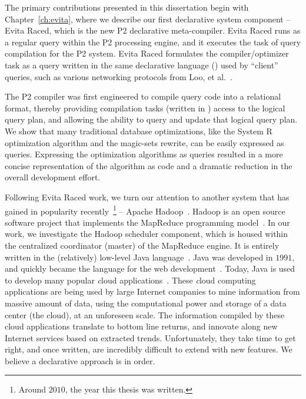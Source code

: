 The primary contributions presented in this dissertation begin with
Chapter~\ref{ch:evita}, where we describe our first declarative system
component -- Evita Raced, which is the new P2 declarative meta-compiler.  Evita
Raced runs as a regular query within the P2 processing engine, and it executes
the task of query compilation for the P2 system.  Evita Raced formulates the
compiler/optimizer task as a query written in the same declarative language
(\OVERLOG) used by ``client'' queries, such as various networking protocols
from Loo, et al.~\cite{loo-sigmod06, p2:sosp}.

The P2 compiler was first engineered to compile query code into a relational
format, thereby providing compilation tasks (written in \OVERLOG) access to the
logical query plan, and allowing the ability to query and update that logical
query plan.  We show that many traditional database optimizations, like the
System R optimization algorithm and the magic-sets rewrite, can be easily
expressed as \OVERLOG queries.  Expressing the optimization algorithms as
\OVERLOG queries resulted in a more concise representation of the algorithm as
code and a dramatic reduction in the overall development effort.
 
Following Evita Raced work, we turn our attention to another system that has
gained in popularity recently~\footnote{Around $2010$, the year this thesis was
written.} -- Apache Hadoop~\cite{hadoop}.  Hadoop is an open source software
project that implements the MapReduce programming model~\cite{mapreduce-osdi}.
In our work, we investigate the Hadoop scheduler component, which is housed
within the centralized coordinator (master) of the MapReduce engine.  It is
entirely written in the (relatively) low-level Java language~\cite{java}.  Java
was developed in $1991$, and quickly became the language for the web
development~\cite{java-history}.  Today, Java is used to develop many popular
{\emph cloud} applications~\cite{pig-sigmod, hive-vldb, zookeeper, hbase,
cassandra}.  These {\emph cloud computing} applications are being used by large
Internet companies to mine information from massive amount of data, using the
computational power and storage of a data center (the cloud), at an unforeseen
scale.  The information compiled by these cloud applications translate to
bottom line returns, and innovate along new Internet services based on
extracted trends.  Unfortunately, they take time to get right, and once
written, are incredibly difficult to extend with new features.  We believe a
declarative approach is in order.

